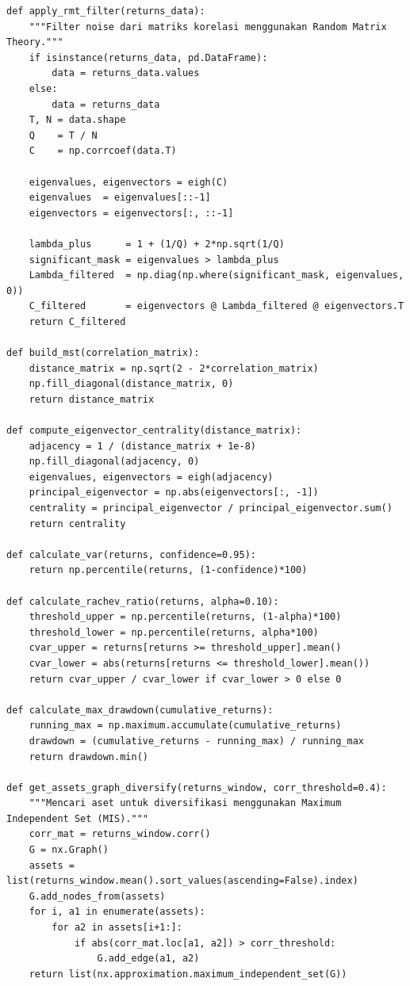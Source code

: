 \documentclass[12pt,a4paper]{article}
\begin{document}
\begin{lstlisting}[caption={Algoritma Network dan Metrik Risiko}]
def apply_rmt_filter(returns_data):
    """Filter noise dari matriks korelasi menggunakan Random Matrix Theory."""
    if isinstance(returns_data, pd.DataFrame):
        data = returns_data.values
    else:
        data = returns_data
    T, N = data.shape
    Q    = T / N
    C    = np.corrcoef(data.T)

    eigenvalues, eigenvectors = eigh(C)
    eigenvalues  = eigenvalues[::-1]
    eigenvectors = eigenvectors[:, ::-1]

    lambda_plus      = 1 + (1/Q) + 2*np.sqrt(1/Q)
    significant_mask = eigenvalues > lambda_plus
    Lambda_filtered  = np.diag(np.where(significant_mask, eigenvalues, 0))
    C_filtered       = eigenvectors @ Lambda_filtered @ eigenvectors.T
    return C_filtered

def build_mst(correlation_matrix):
    distance_matrix = np.sqrt(2 - 2*correlation_matrix)
    np.fill_diagonal(distance_matrix, 0)
    return distance_matrix

def compute_eigenvector_centrality(distance_matrix):
    adjacency = 1 / (distance_matrix + 1e-8)
    np.fill_diagonal(adjacency, 0)
    eigenvalues, eigenvectors = eigh(adjacency)
    principal_eigenvector = np.abs(eigenvectors[:, -1])
    centrality = principal_eigenvector / principal_eigenvector.sum()
    return centrality

def calculate_var(returns, confidence=0.95):
    return np.percentile(returns, (1-confidence)*100)

def calculate_rachev_ratio(returns, alpha=0.10):
    threshold_upper = np.percentile(returns, (1-alpha)*100)
    threshold_lower = np.percentile(returns, alpha*100)
    cvar_upper = returns[returns >= threshold_upper].mean()
    cvar_lower = abs(returns[returns <= threshold_lower].mean())
    return cvar_upper / cvar_lower if cvar_lower > 0 else 0

def calculate_max_drawdown(cumulative_returns):
    running_max = np.maximum.accumulate(cumulative_returns)
    drawdown = (cumulative_returns - running_max) / running_max
    return drawdown.min()

def get_assets_graph_diversify(returns_window, corr_threshold=0.4):
    """Mencari aset untuk diversifikasi menggunakan Maximum Independent Set (MIS)."""
    corr_mat = returns_window.corr()
    G = nx.Graph()
    assets = list(returns_window.mean().sort_values(ascending=False).index)
    G.add_nodes_from(assets)
    for i, a1 in enumerate(assets):
        for a2 in assets[i+1:]:
            if abs(corr_mat.loc[a1, a2]) > corr_threshold:
                G.add_edge(a1, a2)
    return list(nx.approximation.maximum_independent_set(G))
\end{lstlisting}
\end{document}

